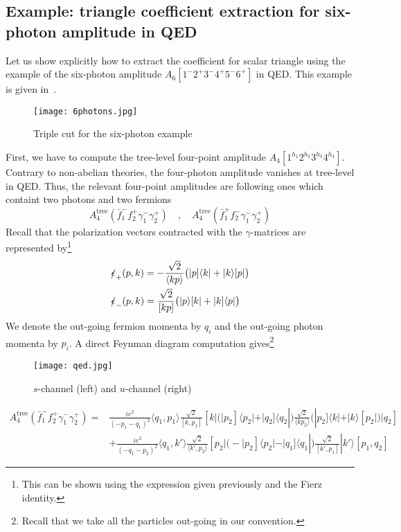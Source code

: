 \subsection{Example: triangle coefficient extraction for six-photon amplitude in QED}
Let us show explicitly how to extract the coefficient for scalar triangle using the example of the six-photon amplitude $A_6[1^-2^+3^-4^+5^-6^+]$ in QED.
This example is given in~\cite{Forde:2007mi}.
\begin{figure}
  \centering
  \texttt{[image: 6photons.jpg]}
  \caption{Triple cut for the six-photon example}
  \label{fig-6photons}
\end{figure}
First, we have to compute the tree-level four-point amplitude $A_4[1^{h_1}2^{h_2}3^{h_3}4^{h_4}]$. 
Contrary to non-abelian theories, the four-photon amplitude vanishes at tree-level in QED.
Thus, the relevant four-point amplitudes are following ones which containt two photons and two fermions
\begin{equation*}
A_4^{\mathrm{tree}}(\bar{f}_1^- f_2^+ \gamma_1^-\gamma_2^+)
\quad,\quad
A_4^{\mathrm{tree}}(\bar{f}_1^+ f_2^- \gamma_1^-\gamma_2^+)
\end{equation*}
Recall that the polarization vectors contracted with the $\gamma$-matrices are represented by\footnote{This can be shown using the expression given previously and the Fierz identity.}
\begin{equation*}
\begin{split}
& \slashed{\epsilon}_+(p,k) = -\frac{\sqrt{2}}{\langle kp\rangle}\big(|p]\langle k| + |k\rangle[p|\big)
\\
& \slashed{\epsilon}_-(p,k) = \frac{\sqrt{2}}{[kp]}\big(|p\rangle [k| + |k]\langle p|\big)
\end{split}
\end{equation*}
We denote the out-going fermion momenta by $q_i$ and the out-going photon momenta by $p_i$. 
A direct Feynman diagram computation gives\footnote{Recall that we take all the particles out-going in our convention.}
\begin{figure}[h]
  \centering
  \texttt{[image: qed.jpg]}
  \caption{$s$-channel (left) and $u$-channel (right)}
  \label{fig-qed}
\end{figure}
%
\begin{equation*}
\begin{split}
A_{4}^{\mathrm{tree}}(\bar{f}_1^- f_2^+ \gamma_1^-\gamma_2^+) 
= &
\frac{ie^2}{(-p_1 - q_1)^2}\langle q_1, p_1\rangle \frac{\sqrt{2}}{[k, p_1]}
[k|\big(|p_2] \langle p_2| + |q_2]\langle q_2|\big)
\frac{\sqrt{2}}{\langle k p_2\rangle}
\big(|p_2]\langle k| + |k\rangle[p_2|\big) |q_2]
\\
&
+\frac{ie^2}{(-q_1-p_2)^2}\langle q_1, k'\rangle
\frac{\sqrt{2}}{\langle k', p_2\rangle}[p_2|
\big( -|p_2]\langle p_2| - |q_1]\langle q_1|\big)
\frac{\sqrt{2}}{[k', p_1]}|k'\rangle [p_1, q_2]
\end{split}
\end{equation*}

